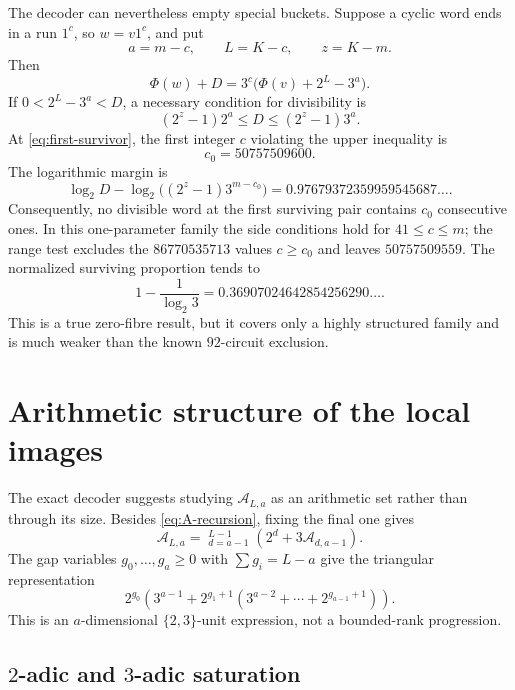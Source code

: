 \documentclass[11pt]{amsart}
\numberwithin{equation}{section}
\newcommand{\A}{\mathcal A}
\begin{document}
The decoder can nevertheless empty special buckets.  Suppose a cyclic word ends in a run $1^c$, so $w=v1^c$, and put
\[
a=m-c,
\qquad L=K-c,
\qquad z=K-m.
\]
Then
\begin{equation}\label{eq:run-identity}
\Phi(w)+D
=3^c\bigl(\Phi(v)+2^L-3^a\bigr).
\end{equation}
If $0<2^L-3^a<D$, a necessary condition for divisibility is
\begin{equation}\label{eq:run-necessary}
(2^z-1)2^a\le D\le(2^z-1)3^a.
\end{equation}
At \eqref{eq:first-survivor}, the first integer $c$ violating the upper inequality is
\begin{equation}\label{eq:c0-run}
c_0=50757509600.
\end{equation}
The logarithmic margin is
\[
\log_2D-\log_2\bigl((2^z-1)3^{m-c_0}\bigr)
=0.97679372359959545687\ldots.
\]
Consequently, no divisible word at the first surviving pair contains $c_0$ consecutive ones.  In this one-parameter family the side conditions hold for $41\le c\le m$; the range test excludes the $86770535713$ values $c\ge c_0$ and leaves $50757509559$.  The normalized surviving proportion tends to
\[
1-\frac1{\log_2 3}=0.36907024642854256290\ldots.
\]
This is a true zero-fibre result, but it covers only a highly structured family and is much weaker than the known $92$-circuit exclusion.

\section{Arithmetic structure of the local images}\label{sec:A-structure}

The exact decoder suggests studying $\A_{L,a}$ as an arithmetic set rather than through its size.  Besides \eqref{eq:A-recursion}, fixing the final one gives
\begin{equation}\label{eq:last-one-recursion}
\A_{L,a}
=\mathop{\dot\bigcup}_{d=a-1}^{L-1}
\left(2^d+3\A_{d,a-1}\right).
\end{equation}
The gap variables $g_0,\ldots,g_a\ge0$ with $\sum g_i=L-a$ give the triangular representation
\begin{equation}\label{eq:gap-representation}
2^{g_0}\left(3^{a-1}+2^{g_1+1}
\left(3^{a-2}+\cdots+2^{g_{a-1}+1}\right)\right).
\end{equation}
This is an $a$-dimensional $\{2,3\}$-unit expression, not a bounded-rank progression.

\subsection{$2$-adic and $3$-adic saturation}
\end{document}
